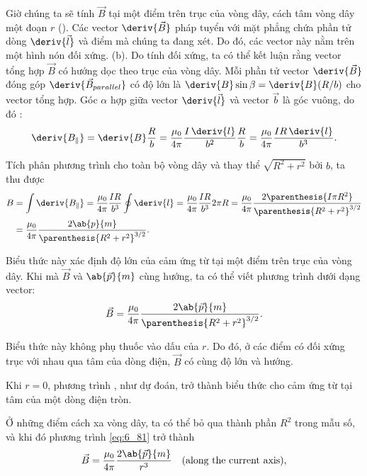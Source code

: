 Giờ chúng ta sẽ tính  $\vec{B}$ tại một điểm trên trục của vòng dây, cách tâm vòng dây một đoạn $r$ (). Các vector  $\deriv{\vec{B}}$ pháp tuyển với mặt phẳng chứa phần tử dòng $\deriv{\vec{l}}$ và điểm mà chúng ta đang xét. Do đó, các vector này nằm trên một hình nón đối xứng. (b). Do tính đối xứng, ta có thể kết luận rằng vector tổng hợp $\vec{B}$ có hướng dọc theo trục của vòng dây.
Mỗi phần tử vector $\deriv{\vec{B}}$ đóng góp  $\deriv{\vec{B}_{parallel}}$ có độ lớn là $\deriv{B}\sin\beta=\deriv{B}(R/b)$ cho vector tổng hợp. Góc $\alpha$ hợp giữa vector $\deriv{\vec{l}}$ và vector $\vec{b}$ là góc vuông, do đó : 
\begin{equation*}
    \deriv{B_{\parallel}} = \deriv{B} \frac{R}{b} = \frac{\mu_0}{4\pi} \frac{I\, \deriv{l}}{b^2} \frac{R}{b} = \frac{\mu_0}{4\pi} \frac{I R\, \deriv{l}}{b^3}.
\end{equation*}

\noindent
Tích phân phương trình cho toàn bộ vòng dây và thay thể $\sqrt{R^2+r^2}$ bởi $b$, ta thu được 
\begin{align}
    B &= \int \deriv{B_{\parallel}} = \frac{\mu_0}{4\pi} \frac{I R}{b^3} \oint \deriv{l} = \frac{\mu_0}{4\pi} \frac{I R}{b^3} 2\pi R = \frac{\mu_0}{4\pi} \frac{2\parenthesis{I \pi R^2}}{\parenthesis{R^2+r^2}^{3/2}} \nonumber\\
    &= \frac{\mu_0}{4\pi} \frac{2 \ab{p}{m}}{\parenthesis{R^2+r^2}^{3/2}}. \label{eq:6_80}
\end{align}

\noindent
Biểu thức này xác định độ lớn của cảm ứng từ tại một điểm trên trục của vòng dây. Khi mà $\vec{B}$ và $\ab{\vec{p}}{m}$ cùng hướng, ta có thể viết phương trình  dưới dạng vector:
\begin{equation}\label{eq:6_81}
    \vec{B} = \frac{\mu_0}{4\pi} \frac{2 \ab{\vec{p}}{m}}{\parenthesis{R^2+r^2}^{3/2}}.
\end{equation}

\noindent
Biểu thức này không phụ thuốc vào dấu của $r$. Do đó, ở các điểm có đối xứng trục với nhau qua tâm của dòng điện,  $\vec{B}$ có cùng độ lớn và hướng.

Khi $r=0$, phương trình , như dự đoán, trở thành biểu thức  cho cảm ứng từ tại tâm của một dòng điện tròn.

Ở những điểm cách xa vòng dây, ta có thể bỏ qua thành phần $R^2$ trong mẫu số, và khi đó phương trình \eqref{eq:6_81} trở thành
\begin{equation}\label{eq:6_82}
    \vec{B} = \frac{\mu_0}{4\pi} \frac{2 \ab{\vec{p}}{m}}{r^3}\quad (\text{along the current axis}),
\end{equation}

